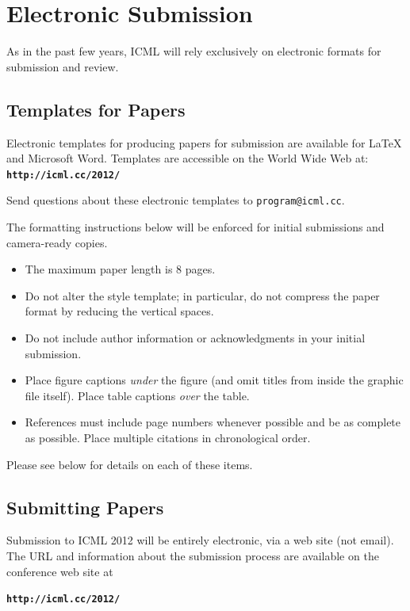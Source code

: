 \documentclass{article}
\begin{document}
\section{Electronic Submission}
\label{submission}

As in the past few years, ICML will rely exclusively on
electronic formats for submission and review. 


\subsection{Templates for Papers}

Electronic templates for producing papers for submission are available
for \LaTeX\/ and Microsoft Word. Templates are accessible on the World
Wide Web at:\\
\textbf{\texttt{http://icml.cc/2012/}}

\noindent
Send questions about these electronic templates to
\texttt{program@icml.cc}.

The formatting instructions below will be enforced for initial submissions and camera-ready copies. 
\begin{itemize}
\item The maximum paper length is 8 pages.
\item Do not alter the style template; in particular, do not compress the paper format by reducing the vertical spaces.
\item Do not include author information or acknowledgments in your
  initial submission. 
\item Place figure captions {\em under} the figure (and omit titles from
  inside the graphic file itself).  Place table captions {\em over}
  the table.
\item References must include page numbers whenever possible and be as
  complete as possible.  Place multiple citations in chronological order.  
\end{itemize}
Please see below for details on each of these items.

\subsection{Submitting Papers}

Submission to ICML 2012 will be entirely electronic, via a web site
(not email).  The URL and information about the submission process
are available on the conference web site at

\textbf{\texttt{http://icml.cc/2012/}}
\end{document}
